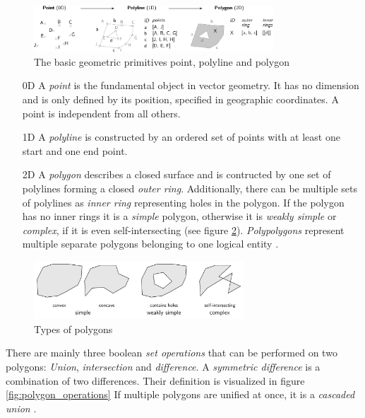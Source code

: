 \begin{figure}[H]
  \vspace{1em}
  \centering
  \includegraphics[width=0.8\textwidth]{graphics/basics/hgis/geometric_primitives}
  \caption{The basic geometric primitives point, polyline and polygon}
  \label{fig:geometric_primitives}
\end{figure}

\begin{enumerate}
  \item[0D] A \emph{point} is the fundamental object in vector geometry. It has no dimension and is only defined by its position, specified in geographic coordinates. A point is independent from all others.
  \item[1D] A \emph{polyline} is constructed by an ordered set of points with at least one start and one end point.
  \item[2D] A \emph{polygon} describes a closed surface and is contructed by one set of polylines forming a closed \emph{outer ring}. Additionally, there can be multiple sets of polylines as \emph{inner ring} representing holes in the polygon. If the polygon has no inner rings it is a \emph{simple} polygon, otherwise it is \emph{weakly simple} or \emph{complex}, if it is even self-intersecting (see figure \ref{fig:polygon_properties}). \emph{Polypolygons} represent multiple separate polygons belonging to one logical entity \cite{polygons}.
\end{enumerate}

\begin{figure}[H]
  \centering
  \includegraphics[width=0.7\textwidth]{graphics/basics/hgis/polygon_properties}
  \caption{Types of polygons}
  \label{fig:polygon_properties}
\end{figure}

There are mainly three boolean \emph{set operations} that can be performed on two polygons: \emph{Union}, \emph{intersection} and \emph{difference}. A \emph{symmetric difference} is a combination of two differences. Their definition is visualized in figure \ref{fig:polygon_operations}
If multiple polygons are unified at once, it is a \emph{cascaded union}
\cite{bolstad2008gis}.


